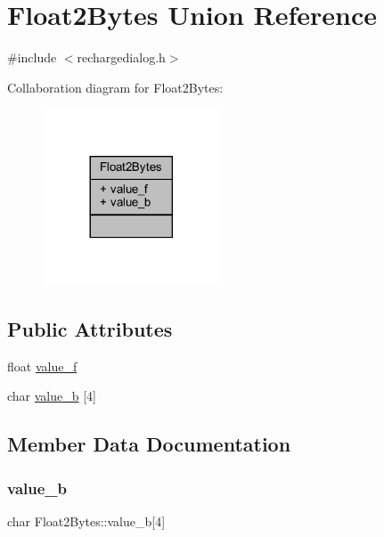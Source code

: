 \hypertarget{union_float2_bytes}{}\section{Float2\+Bytes Union Reference}
\label{union_float2_bytes}


{\ttfamily \#include $<$rechargedialog.\+h$>$}



Collaboration diagram for Float2\+Bytes\+:
\nopagebreak
\begin{figure}[H]
\begin{center}
\leavevmode
\includegraphics[width=149pt]{union_float2_bytes__coll__graph}
\end{center}
\end{figure}
\subsection*{Public Attributes}
\begin{DoxyCompactItemize}
\item 
float \mbox{\hyperlink{union_float2_bytes_af2ad64a19825a68f71d1bff4fd320724}{value\+\_\+f}}
\item 
char \mbox{\hyperlink{union_float2_bytes_ac1a617e7b111052faab2cc51bae3de85}{value\+\_\+b}} \mbox{[}4\mbox{]}
\end{DoxyCompactItemize}


\subsection{Member Data Documentation}
\mbox{\label{union_float2_bytes_ac1a617e7b111052faab2cc51bae3de85}} 
\subsubsection{\texorpdfstring{value\_b}{value\_b}}
{\footnotesize\ttfamily char Float2\+Bytes\+::value\+\_\+b\mbox{[}4\mbox{]}}

